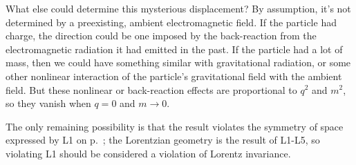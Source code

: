What else could determine this mysterious displacement?
By assumption, it's not determined by a preexisting, ambient electromagnetic field.
If the particle had charge, the direction could be one imposed by the back-reaction from the electromagnetic
radiation it had emitted in the past. If the particle had a lot of mass, then we could have
something similar with gravitational radiation, or some other nonlinear interaction of the
particle's gravitational field with the ambient field. But these nonlinear or back-reaction
effects are proportional to $q^2$ and $m^2$, so they vanish when $q=0$ and $m\rightarrow 0$.

The only remaining possibility is that the result violates the symmetry of space expressed by L1 on p.~\pageref{sec:lorentz-geometry};
the Lorentzian geometry is the result of L1-L5, so violating L1 should be considered a violation of Lorentz
invariance.
